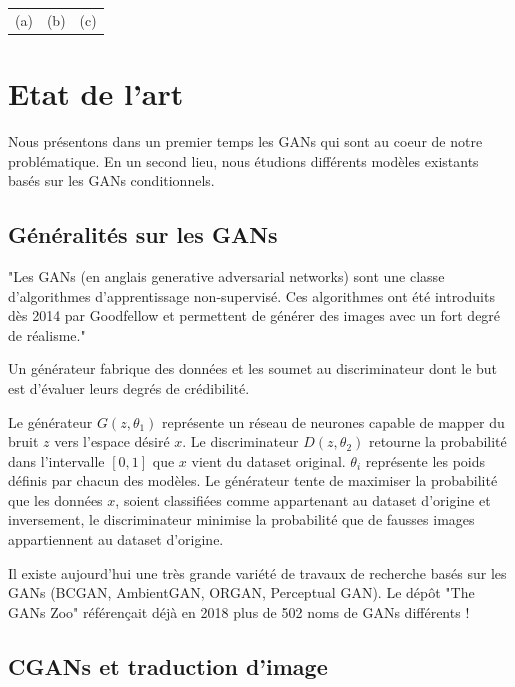 \documentclass[a4paper, 12pt]{report}
\begin{document}
\begin{center}
\begin{tabular}{ccc}
    (a)&(b)&(c)
  \end{tabular}
\end{center}



\chapter{Etat de l'art}
 
Nous présentons dans un premier temps les GANs qui sont au coeur de notre problématique. En un second lieu, nous étudions différents modèles existants basés sur les GANs conditionnels. 

\section{Généralités sur les GANs}

"Les GANs (en anglais generative adversarial networks) sont une classe d'algorithmes d'apprentissage non-supervisé. Ces algorithmes ont été introduits dès 2014 par Goodfellow et permettent de générer des images avec un fort degré de réalisme." \cite{wiki:Reseaux-antagonistes-generatifs}

Un générateur fabrique des données et les soumet au discriminateur dont le but est d'évaluer leurs degrés de crédibilité. 

Le générateur $G(z, \theta_{1})$ représente un réseau de neurones capable de mapper du bruit $z$ vers l'espace désiré $x$. Le discriminateur $D(z, \theta_{2})$ retourne la probabilité dans l'intervalle $[0,1]$ que $x$ vient du dataset original. $\theta_{i}$ représente les poids définis par chacun des modèles. Le générateur tente de maximiser la probabilité que les données $x$, soient classifiées comme appartenant au dataset d'origine et inversement, le discriminateur minimise la probabilité que de fausses images appartiennent au dataset d'origine.

Il existe aujourd'hui une très grande variété de travaux de recherche basés sur les GANs (BCGAN, AmbientGAN, ORGAN, Perceptual GAN). Le dépôt "The GANs Zoo" \cite{hindupuravinash} référençait déjà en 2018 plus de 502 noms de GANs différents !


\section{CGANs et traduction d'image}
\end{document}
